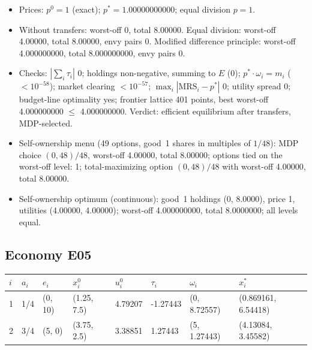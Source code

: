 \begin{itemize}[leftmargin=1.2em,itemsep=0pt,topsep=2pt]\footnotesize
\item Prices: $p^0 = 1$ (exact); $p^* = 1.00000000000$; equal division $p = 1$.
\item Without transfers: worst-off 0, total 8.00000. Equal division: worst-off 4.00000, total 8.00000, envy pairs 0. Modified difference principle: worst-off 4.000000000, total 8.000000000, envy pairs 0.
\item Checks: $|\sum_i\tau_i|$ 0; holdings non-negative, summing to $E$ (0); $p^*\cdot\omega_i = m_i$ ($<10^{-58}$); market clearing $<10^{-57}$; $\max_i|\mathrm{MRS}_i - p^*|$ 0; utility spread 0; budget-line optimality yes; frontier lattice 401 points, best worst-off 4.000000000 $\leq$ 4.000000000. Verdict: efficient equilibrium after transfers, MDP-selected.
\item Self-ownership menu (49 options, good~1 shares in multiples of $1/48$): MDP choice $(0, 48)/48$, worst-off 4.00000, total 8.00000; options tied on the worst-off level: 1; total-maximizing option $(0, 48)/48$ with worst-off 4.00000, total 8.00000.
\item Self-ownership optimum (continuous): good~1 holdings (0, 8.0000), price 1, utilities (4.00000, 4.00000); worst-off 4.000000000, total 8.0000000; all levels equal.
\end{itemize}

\subsection*{Economy E05}
\label{ec:E05}
{\scriptsize\setlength{\tabcolsep}{3pt}
\begin{tabular}{@{}llllllll@{}}
\toprule
$i$ & $a_i$ & $e_i$ & $x^0_i$ & $u^0_i$ & $\tau_i$ & $\omega_i$ & $x^*_i$ \\
\midrule
1 & 1/4 & (0, 10) & (1.25, 7.5) & 4.79207 & -1.27443 & (0, 8.72557) & (0.869161, 6.54418) \\
2 & 3/4 & (5, 0) & (3.75, 2.5) & 3.38851 & 1.27443 & (5, 1.27443) & (4.13084, 3.45582) \\
\bottomrule\end{tabular}}

